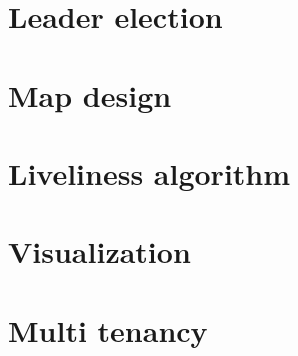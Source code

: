 \section{Leader election}


\section{Map design}
\label{sec:03_06_Map_Design}


\section{Liveliness algorithm}


\section{Visualization}
\label{sec:0308}


\section{Multi tenancy}
